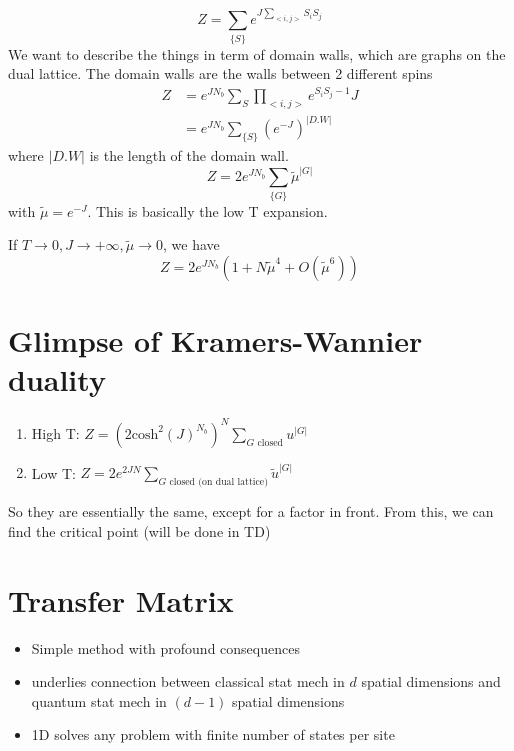 \documentclass[a4paper]{book}
\theoremstyle{definition}
\theoremstyle{remark}
\begin{document}
\begin{equation}
    Z = \sum_{\{S\}} e^{J\sum_{<i,j>} S_iS_j}
\end{equation}
We want to describe the things in term of domain walls, which are graphs on the dual lattice. The domain walls are the walls between 2 different spins 
\begin{equation}
    \begin{aligned}
        Z &= e^{JN_b}\sum_S \prod_{<i,j>} e^{S_iS_j - 1}J \\
        &= e^{JN_b} \sum_{\{S\}}(e^{-J})^{|D.W|}
    \end{aligned}
\end{equation}
where $|D.W|$ is the length of the domain wall. 
\begin{equation}
    Z = 2e^{JN_b} \sum_{\{G\}}\tilde{\mu}^{|G|}
\end{equation}
with $\tilde{\mu} = e^{-J}$. This is basically the low T expansion. \par \medskip 

If $T\rightarrow 0, J \rightarrow +\infty, \tilde{\mu} \rightarrow 0$, we have 
\begin{equation}
    Z = 2e^{JN_b} (1 + N\tilde{\mu}^4 + O(\tilde{\mu}^6))
\end{equation}

\section{Glimpse of Kramers-Wannier duality}
\begin{enumerate}
    \item High T: $Z = (2\text{cosh}^2(J)^{N_b})^N \sum_{G\text{ closed}} u^{|G|}$
    \item Low T: $Z = 2e^{2JN} \sum_{G\text{ closed (on dual lattice)}} \tilde{u}^{|G|}$
\end{enumerate}
So they are essentially the same, except for a factor in front. From this, we can find the critical point (will be done in TD)


\section{Transfer Matrix}

\begin{itemize}
    \item Simple method with profound consequences 
    \item underlies connection between classical stat mech in $d$ spatial dimensions and quantum stat mech in $(d-1)$ spatial dimensions
    \item 1D solves any problem with finite number of states per site 
\end{itemize}
\end{document}
